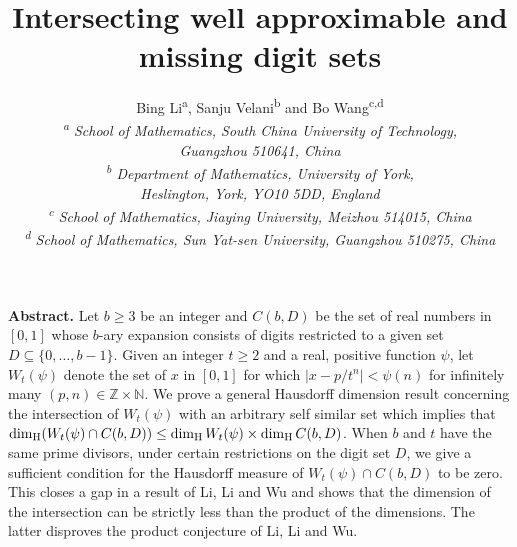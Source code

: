 \documentclass[12pt]{article}
\theoremstyle{definition}
\theoremstyle{remark}
\begin{document}
\title{Intersecting well approximable and missing digit sets}

\author{Bing Li\textsuperscript{a}, Sanju Velani\textsuperscript{b} and Bo Wang\textsuperscript{c,d} \\
\small \it \textsuperscript{\rm a }School of Mathematics, South China University of Technology,\\[-1ex]
\small \it Guangzhou 510641, China\\
\small \it \textsuperscript{\rm b }Department of Mathematics, University of York,\\[-1ex]
\small \it Heslington, York, YO10 5DD, England\\
\small \it \textsuperscript{\rm c }School of Mathematics, Jiaying University,
\small \it Meizhou 514015, China\\
\small \it \textsuperscript{\rm d }School of Mathematics, Sun Yat-sen University,
\small \it Guangzhou 510275, China
}
\date{}
\maketitle
\begin{center}
\begin{minipage}{135mm}
{\footnotesize {\bf Abstract.}  Let $b\geq3$ be an integer and $C(b,D)$ be the set of real numbers in $[0,1]$ whose $b$-ary expansion consists of digits restricted  to a given set $D\subseteq\{0,\ldots,b-1\}$. Given an integer $t\geq2$ and a real, positive function $\psi$, let $W_{t}(\psi)$ denote the set of  $x$ in $[0,1]$ for which
 $|x-  p/t^{n}|<\psi(n)$ for infinitely many $(p,n)\in\mathbb{Z}\times\mathbb{N}$. We prove a general Hausdorff dimension result concerning  the intersection of $W_{t}(\psi)$ with an arbitrary self similar set which  implies that  $\dim_{\rm H}(W_{t}(\psi)\cap C(b,D))   \le    \dim_{\rm H}W_{t}(\psi)   \times \dim_{\rm H}C(b,D)$.   When $b$ and $t$ have the same prime divisors,  under certain restrictions on the digit set $D$,  we give a sufficient condition for the Hausdorff measure of $W_{t}(\psi)\cap C(b,D)$ to be zero.  This closes  a gap in a result of  Li, Li and Wu \cite{LLW2025} and shows that the dimension of the intersection can be strictly less than    the product of the dimensions.  The latter disproves the product conjecture of  Li, Li and Wu. 
}
\end{minipage}
\end{center}
\end{document}

